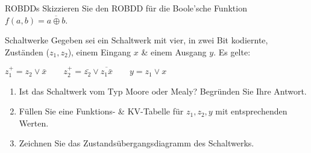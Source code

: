 \documentclass{exercisesheet}
\begin{document}
  \begin{exercise*}{ROBDDs}
    Skizzieren Sie den ROBDD für die Boole'sche Funktion $f(a, b) = \overline{a \oplus b}$.
  \end{exercise*}

  \begin{solution*}
  \end{solution*}

  \begin{exercise*}{Schaltwerke}
    Gegeben sei ein Schaltwerk mit vier, in zwei Bit kodiernte, Zuständen ($z_1, z_2$), einem Eingang $x$ \& einem Ausgang $y$. Es gelte:
    \begin{center}$z_1^+ = z_2 \lor \bar{x}\qquad z_2^+ = \bar{z_2} \lor \overline{z_1\bar{x}}\qquad y = z_1 \lor x$\end{center}
    \begin{enumerate}
      \item Ist das Schaltwerk vom Typ Moore oder Mealy? Begründen Sie Ihre Antwort.
      \item Füllen Sie eine Funktions- \& KV-Tabelle für $z_1, z_2, y$ mit entsprechenden Werten.
      \item Zeichnen Sie das Zustandsübergangsdiagramm des Schaltwerks.
    \end{enumerate}
  \end{exercise*}
\end{document}

